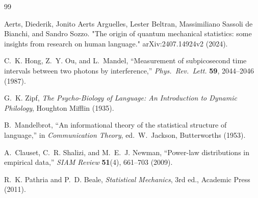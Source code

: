 \documentclass[11pt,a4paper]{article}
\begin{document}
\begin{thebibliography}{99}

Aerts, Diederik, Jonito Aerts Arguelles, Lester Beltran, Massimiliano Sassoli de Bianchi, and Sandro Sozzo. "The origin of quantum mechanical statistics: some insights from research on human language." 
\newblock arXiv:2407.14924v2 (2024).

C.~K. Hong, Z.~Y. Ou, and L.~Mandel,
\newblock ``Measurement of subpicosecond time intervals between two photons by interference,''
\newblock \emph{Phys.\ Rev.\ Lett.} \textbf{59}, 2044--2046 (1987).

G.~K. Zipf,
\newblock \emph{The Psycho-Biology of Language: An Introduction to Dynamic Philology},
\newblock Houghton Mifflin (1935).

B.~Mandelbrot,
\newblock ``An informational theory of the statistical structure of language,''
\newblock in \emph{Communication Theory}, ed.\ W.~Jackson,
\newblock Butterworths (1953).

A.~Clauset, C.~R. Shalizi, and M.~E.~J. Newman,
\newblock ``Power-law distributions in empirical data,''
\newblock \emph{SIAM Review} \textbf{51}(4), 661--703 (2009).

R.~K. Pathria and P.~D. Beale,
\newblock \emph{Statistical Mechanics}, 3rd ed.,
\newblock Academic Press (2011).

\end{thebibliography}
\end{document}

